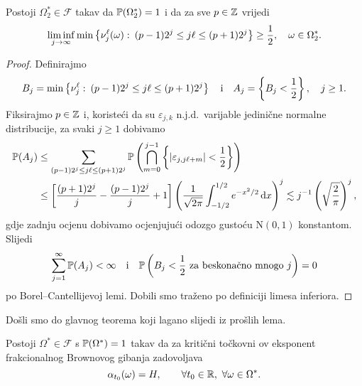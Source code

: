 \documentclass[main.tex]{subfiles}
\begin{document}
\begin{lema}\label{holpo-lema4}
	Postoji \( \Omega_2^* \in \mathcal F \) takav da \( \P(\Omega_2^*)=1 \) i da za
	sve \( p \in \Z \) vrijedi
	\begin{equation}
		\liminf\limits_{j \ub} \min \left\{ \nu_j^\ell(\omega) \st
		(p-1)2^j \le j\ell \le (p+1)2^j \right\} \ge \frac 12,
		\quad \omega \in \Omega_2^*.
	\end{equation}
\end{lema}

\begin{proof}
	Definirajmo
	\begin{equation}
		B_j = \min\left\{ \nu_j^\ell \st (p-1)2^j \le j\ell \le (p+1)2^j \right\}
		\quad \text i \quad A_j = \left\{ B_j < \frac 12 \right\}, \quad j \ge 1.
	\end{equation}
	Fiksirajmo \( p \in \Z \) i, koristeći da su
	\( \varepsilon_{j,k} \) n.j.d.\ varijable jedinične normalne distribucije,
	za svaki \( j \ge 1 \) dobivamo
	\begin{align}
		\P(A_j) & \le \sum_{(p-1)2^j \le j\ell \le (p+1)2^j} \P\left(\bigcap_{m=0}^{j-1} \left\{ \abs{\varepsilon_{j, j\ell+m}} < \frac 12 \right\}\right) \\
		        & \le \left[ \frac {(p+1)2^j}j - \frac{(p-1)2^j}j + 1  \right]
		\left( \frac 1{\sqrt{2\pi}} \int_{-1/2}^{1/2}e^{-x^2/2} \D x \right)^j
		\lesssim j^{-1}\left( \sqrt{\frac 2\pi} \right)^j,
	\end{align}
	gdje zadnju ocjenu dobivamo ocjenjujući odozgo gustoću \( \mathrm N(0,1) \) konstantom.
	Slijedi
	\begin{equation}
		\sum_{j=1}^\infty \P(A_j) < \infty \quad \text i \quad
		\P\left( B_j < \frac 12 \text{ za beskonačno mnogo } j \right) = 0
	\end{equation}
	po Borel--Cantellijevoj lemi. Dobili smo traženo po definiciji limesa
	inferiora.
\end{proof}


Došli smo do glavnog teorema koji lagano
slijedi iz prošlih lema.

\begin{teorem}\label{holpo-tm}
	Postoji \( \Omega^* \in \mathcal F \) s \( \P(\Omega^*)=1 \)
	takav da za kritični točkovni \holder ov eksponent frakcionalnog Brownovog gibanja zadovoljava
	\begin{equation}
		\alpha_{t_0}(\omega) = H, \qquad \forall t_0 \in \R, \ \forall \omega \in \Omega^*.
	\end{equation}
\end{teorem}
\end{document}
